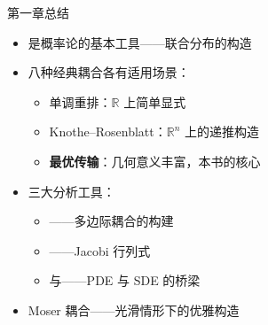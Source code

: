 \documentclass[aspectratio=169,10pt]{beamer}
\begin{document}

\begin{frame}{第一章总结}
  \begin{TLtext}
    \begin{itemize}
      \item {}是概率论的基本工具——联合分布的构造
      \item 八种经典耦合各有适用场景：
        \begin{itemize}
          \item 单调重排：$\mathbb{R}$ 上简单显式
          \item Knothe–Rosenblatt：$\mathbb{R}^n$ 上的递推构造
          \item \textbf{最优传输}：几何意义丰富，本书的核心
        \end{itemize}
      \item 三大分析工具：
        \begin{itemize}
          \item {}——多边际耦合的构建
          \item {}——Jacobi 行列式
          \item {}与——PDE 与 SDE 的桥梁
        \end{itemize}
      \item Moser 耦合——光滑情形下的优雅构造
    \end{itemize}
  \end{TLtext}

  \vspace{0.3em}
\end{frame}

\end{document}
